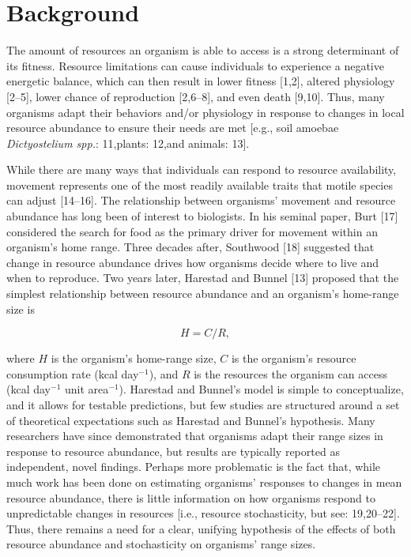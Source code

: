 \documentclass[
  12pt,
]{article}
\begin{document}
\newpage

\section{Background}\label{background}

\noindent The amount of resources an organism is able to access is a strong determinant of its fitness. Resource limitations can cause individuals to experience a negative energetic balance, which can then result in lower fitness {[}1,2{]}, altered physiology {[}2--5{]}, lower chance of reproduction {[}2,6--8{]}, and even death {[}9,10{]}. Thus, many organisms adapt their behaviors and/or physiology in response to changes in local resource abundance to ensure their needs are met {[}e.g., soil amoebae \emph{Dictyostelium spp.}: 11,plants: 12,and animals: 13{]}.

While there are many ways that individuals can respond to resource availability, movement represents one of the most readily available traits that motile species can adjust {[}14--16{]}. The relationship between organisms' movement and resource abundance has long been of interest to biologists. In his seminal paper, Burt {[}17{]} considered the search for food as the primary driver for movement within an organism's home range. Three decades after, Southwood {[}18{]} suggested that change in resource abundance drives how organisms decide where to live and when to reproduce. Two years later, Harestad and Bunnel {[}13{]} proposed that the simplest relationship between resource abundance and an organism's home-range size is

\begin{equation}
H = C / R,
\label{eq:harestad-eq}
\end{equation}

\noindent where \(H\) is the organism's home-range size, \(C\) is the organism's resource consumption rate (kcal day\(^{-1}\)), and \(R\) is the resources the organism can access (kcal day\(^{-1}\) unit area\(^{-1}\)). Harestad and Bunnel's model is simple to conceptualize, and it allows for testable predictions, but few studies are structured around a set of theoretical expectations such as Harestad and Bunnel's hypothesis. Many researchers have since demonstrated that organisms adapt their range sizes in response to resource abundance, but results are typically reported as independent, novel findings. Perhaps more problematic is the fact that, while much work has been done on estimating organisms' responses to changes in mean resource abundance, there is little information on how organisms respond to unpredictable changes in resources {[}i.e., resource stochasticity, but see: 19,20--22{]}. Thus, there remains a need for a clear, unifying hypothesis of the effects of both resource abundance and stochasticity on organisms' range sizes.
\end{document}
